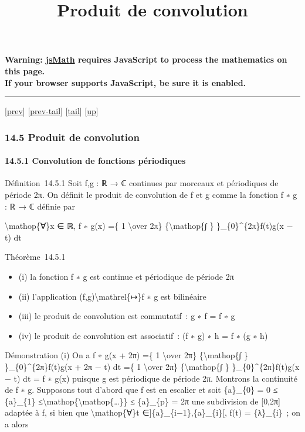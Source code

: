 \documentclass[]{article}
\title{Produit de convolution}
\author{}
\date{}
\begin{document}
\maketitle

\textbf{Warning: \href{http://www.math.union.edu/locate/jsMath}{jsMath}
requires JavaScript to process the mathematics on this page.\\ If your
browser supports JavaScript, be sure it is enabled.}

\begin{center}\rule{3in}{0.4pt}\end{center}

{[}\href{coursse80.html}{prev}{]}
{[}\href{coursse80.html\#tailcoursse80.html}{prev-tail}{]}
{[}\hyperref[tailcoursse81.html]{tail}{]}
{[}\href{coursch15.html\#coursse81.html}{up}{]}

\subsubsection{14.5 Produit de convolution}

\paragraph{14.5.1 Convolution de fonctions périodiques}

Définition~14.5.1 Soit f,g : ℝ → ℂ continues par morceaux et périodiques
de période 2π. On définit le produit de convolution de f et g comme la
fonction f ∗ g : ℝ → ℂ définie par

\textbackslash{}mathop\{∀\}x ∈ ℝ, f ∗ g(x) =\{ 1 \textbackslash{}over
2π\} \{\textbackslash{}mathop\{∫ \} \}\_\{0\}\^{}\{2π\}f(t)g(x − t) dt

Théorème~14.5.1

\begin{itemize}
\itemsep1pt\parskip0pt
\item
  (i) la fonction f ∗ g est continue et périodique de période 2π
\item
  (ii) l'application (f,g)\textbackslash{}mathrel\{↦\}f ∗ g est
  bilinéaire
\item
  (iii) le produit de convolution est commutatif~: g ∗ f = f ∗ g
\item
  (iv) le produit de convolution est associatif~: (f ∗ g) ∗ h = f ∗ (g ∗
  h)
\end{itemize}

Démonstration (i) On a f ∗ g(x + 2π) =\{ 1 \textbackslash{}over 2π\}
\{\textbackslash{}mathop\{∫ \} \}\_\{0\}\^{}\{2π\}f(t)g(x + 2π − t) dt
=\{ 1 \textbackslash{}over 2π\} \{\textbackslash{}mathop\{∫ \}
\}\_\{0\}\^{}\{2π\}f(t)g(x − t) dt = f ∗ g(x) puisque g est périodique
de période 2π. Montrons la continuité de f ∗ g. Supposons tout d'abord
que f est en escalier et soit \{a\}\_\{0\} = 0 ≤ \{a\}\_\{1\}
≤\textbackslash{}mathop\{\textbackslash{}mathop\{\ldots{}\}\} ≤
\{a\}\_\{p\} = 2π une subdivision de {[}0,2π{]} adaptée à f, si bien que
\textbackslash{}mathop\{∀\}t ∈{]}\{a\}\_\{i−1\},\{a\}\_\{i\}{[}, f(t) =
\{λ\}\_\{i\}~; on a alors
\end{document}
